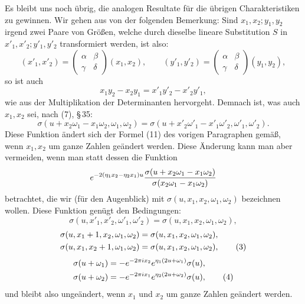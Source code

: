 \documentclass[11pt]{article}
\begin{document}
Es bleibt uns noch übrig, die analogen Resultate für die übrigen Charakteristiken zu gewinnen. Wir gehen aus von der folgenden Bemerkung: Sind $x_1,x_2;y_1,y_2$ irgend zwei Paare von Größen, welche durch dieselbe lineare Substitution $S$ in $x'_1,x'_2;y'_1,y'_2$ transformiert werden, ist also:
\[
(x'_1,x'_2)=\begin{pmatrix}\alpha&\beta\\\gamma&\delta\end{pmatrix}(x_1,x_2),
\qquad
(y'_1,y'_2)=\begin{pmatrix}\alpha&\beta\\\gamma&\delta\end{pmatrix}(y_1,y_2),
\]
so ist auch
\[
x_1y_2-x_2y_1=x'_1y'_2-x'_2y'_1,
\]
wie aus der Multiplikation der Determinanten hervorgeht. Demnach ist, was auch $x_1,x_2$ sei, nach (7), \S\,35:
\begin{equation}
\sigma(u+x_2\omega_1-x_1\omega_2,\omega_1,\omega_2)
=\sigma(u+x'_2\omega'_1-x'_1\omega'_2,\omega'_1,\omega'_2). \tag{1}
\end{equation}
Diese Funktion ändert sich der Formel (11) des vorigen Paragraphen gemäß, wenn $x_1,x_2$ um ganze Zahlen geändert werden. Diese Änderung kann man aber vermeiden, wenn man statt dessen die Funktion
\[
e^{-2(\eta_1x_2-
\eta_2x_1)u}
{\sigma(u+x_2\omega_1-x_1\omega_2)
\over \sigma(x_2\omega_1-x_1\omega_2)}
\]
betrachtet, die wir (für den Augenblick) mit $\sigma(u,x_1,x_2,\omega_1,
\omega_2)$ bezeichnen wollen. Diese Funktion genügt den Bedingungen:
\begin{equation}
\sigma(u,x'_1,x'_2,\omega'_1,\omega'_2)=\sigma(u,x_1,x_2,\omega_1,
\omega_2), \tag{2}
\end{equation}
\begin{align}
\sigma(u,x_1+1,x_2,\omega_1,
\omega_2)&=\sigma(u,x_1,x_2,
\omega_1,
\omega_2),\notag\\
\sigma(u,x_1,x_2+1,
\omega_1,
\omega_2)&=\sigma(u,x_1,x_2,
\omega_1,
\omega_2), \tag{3}
\end{align}
\begin{align}
\sigma(u+\omega_1)&=-e^{-2\pi i x_2}e^{\eta_1(2u+
\omega_1)}\sigma(u),\notag\\
\sigma(u+\omega_2)&=-e^{-2\pi i x_1}e^{\eta_2(2u+
\omega_2)}\sigma(u), \tag{4}
\end{align}
und bleibt also ungeändert, wenn $x_1$ und $x_2$ um ganze Zahlen geändert werden.
\end{document}
